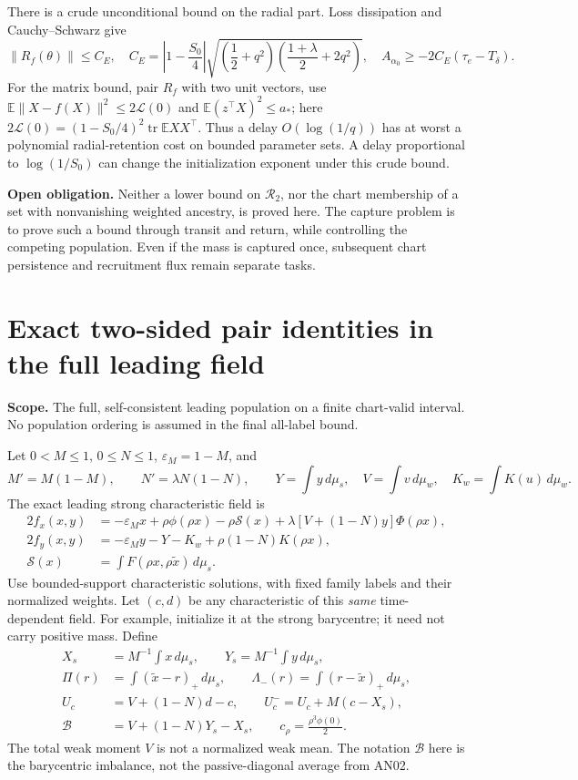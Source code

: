 \documentclass[11pt]{article}
\numberwithin{equation}{section}
\theoremstyle{remark}\newtheorem{remark}[theorem]{Remark}
\newcommand{\E}{\mathbb E}
\newcommand{\dd}{\,d}
\newcommand{\1}{\mathbf 1}
\newcommand{\scope}[1]{\par\noindent\textbf{Scope.} #1\par\smallskip}
\newcommand{\gap}[1]{\par\noindent\textbf{Open obligation.} #1\par\smallskip}
\begin{document}
There is a crude unconditional bound on the radial part. Loss dissipation
and Cauchy--Schwarz give
\begin{equation}\label{inc:AN03:ret:v2:radialfloor}
 \|R_f(\theta)\|\le C_E,
 \quad C_E=\left|1-\frac{S_0}{4}\right|
 \sqrt{\left(\frac12+q^2\right)
       \left(\frac{1+\lambda}{2}+2q^2\right)},
 \quad A_{\alpha_0}\ge-2C_E(\tau_e-T_\delta).
\end{equation}
For the matrix bound, pair $R_f$ with two unit vectors, use
$\E\|X-f(X)\|^2\le2\mathcal L(0)$ and
$\E(z^\top X)^2\le a_*$; here
$2\mathcal L(0)=(1-S_0/4)^2\operatorname{tr}\E XX^\top$.
Thus a delay $O(\log(1/q))$ has at worst a polynomial radial-retention
cost on bounded parameter sets. A delay proportional to $\log(1/S_0)$
can change the initialization exponent under this crude bound.

\gap{Neither a lower bound on $\mathcal R_2$, nor the chart membership
of a set with nonvanishing weighted ancestry, is proved here. The capture
problem is to prove such a bound through transit and return, while
controlling the competing population. Even if the mass is captured once,
subsequent chart persistence and recruitment flux remain separate tasks.}

\section{Exact two-sided pair identities in the full leading field}
\label{inc:AN03:ret:v2:two-sided}
\scope{The full, self-consistent leading population on a finite
chart-valid interval. No population ordering is assumed in the final
all-label bound.}
Let $0<M\le1$, $0\le N\le1$, $\varepsilon_M=1-M$, and
\[
 M'=M(1-M),\qquad N'=\lambda N(1-N),\qquad
 Y=\int y\dd\mu_s,\quad V=\int v\dd\mu_w,\quad K_w=\int K(u)\dd\mu_w.
\]
The exact leading strong characteristic field is
\begin{align}
 2f_x(x,y)&=-\varepsilon_Mx+\rho\phi(\rho x)-\rho\mathcal S(x)
 +\lambda[V+(1-N)y]\Phi(\rho x),\label{inc:AN03:ret:v2:field}\\
 2f_y(x,y)&=-\varepsilon_My-Y-K_w+\rho(1-N)K(\rho x),\nonumber\\
 \mathcal S(x)&=\int F(\rho x,\rho\widetilde x)\dd\mu_s.
 \nonumber
\end{align}
Use bounded-support characteristic solutions, with fixed family labels
and their normalized weights. Let $(c,d)$ be any characteristic of this
\emph{same} time-dependent field. For example, initialize it at the strong
barycentre; it need not carry positive mass. Define
\begin{align}
 X_s&=M^{-1}\int x\dd\mu_s,\qquad Y_s=M^{-1}\int y\dd\mu_s,\nonumber\\
 \Pi(r)&=\int(\widetilde x-r)_+\dd\mu_s,\qquad
 \Lambda_-(r)=\int(r-\widetilde x)_+\dd\mu_s,\nonumber\\
 U_c&=V+(1-N)d-c,\qquad U_c^-=U_c+M(c-X_s),\nonumber\\
 \mathcal B&=V+(1-N)Y_s-X_s,\qquad
 c_\rho=\frac{\rho^3\phi(0)}2.
 \label{inc:AN03:ret:v2:budgets}
\end{align}
The total weak moment $V$ is not a normalized weak mean. The notation
$\mathcal B$ here is the barycentric imbalance, not the passive-diagonal
average from AN02.
\end{document}
